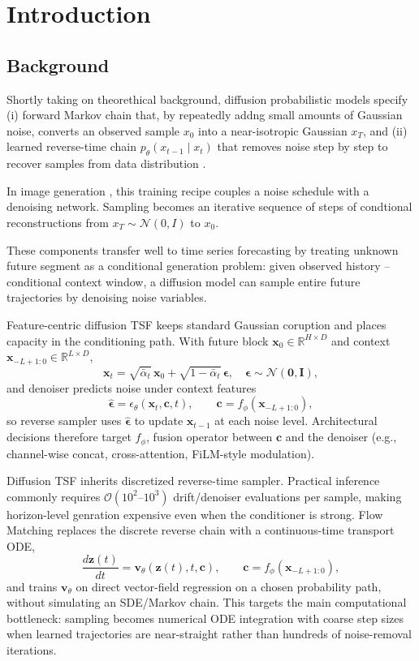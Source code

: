 \chapter{Introduction}

\section{Background}

Shortly taking on theorethical background, diffusion probabilistic models specify (i) forward Markov chain that, by repeatedly addng small amounts of Gaussian noise, converts an observed sample
$x_0$ into a near-isotropic Gaussian $x_T$, and
(ii) learned reverse-time chain $p_\theta(x_{t-1}\!\mid x_t)$ that removes noise step by step to
recover samples from data distribution \cite{sohl2015noneq,ho2020ddpm}.

In image generation \cite{ho2020ddpm},
this training recipe couples a noise schedule with a denoising network. Sampling becomes an
iterative sequence of steps of condtional reconstructions from $x_T\!\sim\!\mathcal{N}(0,I)$ to $x_0$. 

These components transfer well to time series forecasting by treating unknown future segment as a
conditional generation problem: given observed history -- conditional context window, a diffusion model can sample entire future
trajectories by denoising noise variables.

Feature-centric diffusion TSF keeps standard Gaussian coruption and places capacity in the
conditioning path. With future block $\mathbf{x}_0\in\mathbb{R}^{H\times D}$ and context
$\mathbf{x}_{-L+1:0}\in\mathbb{R}^{L\times D}$,
\[
\mathbf{x}_t=\sqrt{\bar\alpha_t}\,\mathbf{x}_0+\sqrt{1-\bar\alpha_t}\,\boldsymbol{\epsilon},\quad
\boldsymbol{\epsilon}\sim\mathcal{N}(\mathbf{0},\mathbf{I}),
\]
and denoiser predicts noise under context features
\[
\hat{\boldsymbol{\epsilon}}=\epsilon_\theta(\mathbf{x}_t,\mathbf{c},t),\qquad
\mathbf{c}=f_\phi(\mathbf{x}_{-L+1:0}),
\]
so reverse sampler uses $\hat{\boldsymbol{\epsilon}}$ to update $\mathbf{x}_{t-1}$ at each
noise level. Architectural decisions therefore target $f_\phi$, fusion operator between
$\mathbf{c}$ and the denoiser (e.g., channel-wise concat, cross-attention, FiLM-style modulation).

Diffusion TSF inherits discretized reverse-time sampler. Practical inference commonly requires
$\mathcal{O}(10^2\text{--}10^3)$ \cite{hu2024flowts} drift/denoiser evaluations per sample, making horizon-level
genration expensive even when the conditioner is strong. Flow Matching \cite{lipman2022flowmatching} replaces the discrete reverse chain with a continuous-time transport ODE,
\[
\frac{d\mathbf{z}(t)}{dt}=\mathbf{v}_\theta(\mathbf{z}(t),t,\mathbf{c}),\qquad
\mathbf{c}=f_\phi(\mathbf{x}_{-L+1:0}),
\]
and trains $\mathbf{v}_\theta$ on direct vector-field regression on a chosen probability path,
without simulating an SDE/Markov chain.
This targets the main computational bottleneck: sampling becomes numerical ODE integration with
coarse step sizes when learned trajectories are near-straight rather than hundreds of
noise-removal iterations. 

